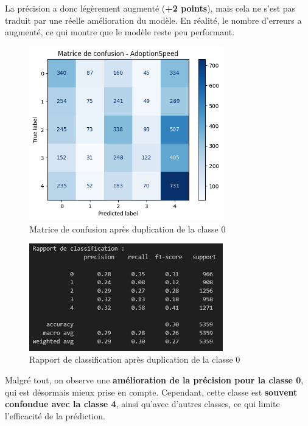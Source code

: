 \documentclass[a4paper,12pt]{article}
\begin{document}
La précision a donc légèrement augmenté (\textbf{+2 points}), mais cela ne s’est pas traduit par une réelle amélioration du modèle. En réalité, le nombre d’erreurs a augmenté, ce qui montre que le modèle reste peu performant.

\begin{figure}[H]
    \centering
    \includegraphics[width=0.75\textwidth]{confusion_logreg_multiplication_classe0.png}
    \caption{Matrice de confusion après duplication de la classe 0}
    \label{fig:confusion_logreg_duplicated}
\end{figure}

\begin{figure}[H]
    \centering
    \includegraphics[width=0.75\textwidth]{classification_report_logreg_multiplication.png}
    \caption{Rapport de classification après duplication de la classe 0}
    \label{fig:report_logreg_duplicated}
\end{figure}

Malgré tout, on observe une \textbf{amélioration de la précision pour la classe 0}, qui est désormais mieux prise en compte. Cependant, cette classe est \textbf{souvent confondue avec la classe 4}, ainsi qu’avec d’autres classes, ce qui limite l’efficacité de la prédiction.
\end{document}
